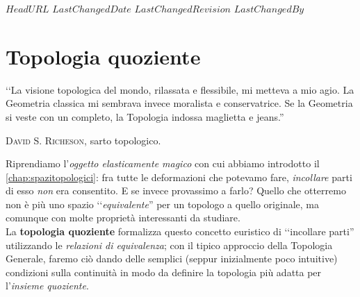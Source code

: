 \svnidlong
{$HeadURL$}
{$LastChangedDate$}
{$LastChangedRevision$}
{$LastChangedBy$}

\chapter{Topologia quoziente}

\begin{introduction}
‘‘La visione topologica del mondo, rilassata e flessibile, mi metteva a mio agio. La Geometria classica mi sembrava invece moralista e conservatrice. Se la Geometria si veste con un completo, la Topologia indossa maglietta e jeans.''
\begin{flushright}
	\textsc{David S. Richeson,} sarto topologico.
\end{flushright}
\end{introduction}
\noindent Riprendiamo l'\textit{oggetto elasticamente magico} con cui abbiamo introdotto il \autoref{chap:spazitopologici}: fra tutte le deformazioni che potevamo fare, \textit{incollare} parti di esso \textit{non} era consentito. E se invece provassimo a farlo? Quello che otterremo non è più uno spazio ‘‘\textit{equivalente}'' per un topologo a quello originale, ma comunque con molte proprietà interessanti da studiare.\\
La \textbf{topologia quoziente} formalizza questo concetto euristico di ‘‘incollare parti'' utilizzando le \textit{relazioni di equivalenza}; con il tipico approccio della Topologia Generale, faremo ciò dando delle semplici (seppur inizialmente poco intuitive) condizioni sulla continuità in modo da definire la topologia più adatta per l'\textit{insieme quoziente}.
